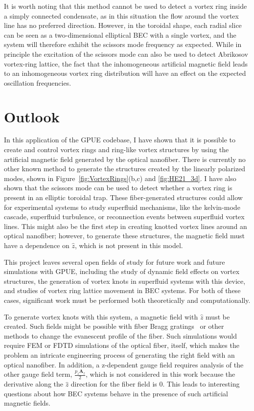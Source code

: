 It is worth noting that this method cannot be used to detect a vortex ring inside a simply connected condensate, as in this situation the flow around the vortex line has no preferred direction.
However, in the toroidal shape, each radial slice can be seen as a two-dimensional elliptical BEC with a single vortex, and the system will therefore exhibit the scissors mode frequency as expected.
While in principle the excitation of the scissors mode can also be used to detect Abrikosov vortex-ring lattice, the fact that the inhomogeneous artificial magnetic field leads to an inhomogeneous vortex ring distribution will have an effect on the expected oscillation frequencies.

\section{Outlook}

In this application of the GPUE codebase, I have shown that it is possible to create and control vortex rings and ring-like vortex structures by using the artificial magnetic field generated by the optical nanofiber.
There is currently no other known method to generate the structures created by the linearly polarized modes, shown in Figure~\ref{fig:VortexRings}(b,c) and \ref{fig:HE21_3d}.
I have also shown that the scissors mode can be used to detect whether a vortex ring is present in an elliptic toroidal trap.
These fiber-generated structures could allow for experimental systems to study superfluid mechanisms, like the kelvin-mode cascade, superfluid turbulence, or reconnection events between superfluid vortex lines.
This might also be the first step in creating knotted vortex lines around an optical nanofiber; however, to generate these structures, the magnetic field must have a dependence on $\hat z$, which is not present in this model.

This project leaves several open fields of study for future work and future simulations with GPUE, including the study of dynamic field effects on vortex structures, the generation of vortex knots in superfluid systems with this device, and studies of vortex ring lattice movement in BEC systems.
For both of these cases, significant work must be performed both theoretically and computationally.

To generate vortex knots with this system, a magnetic field with $\hat z$ must be created.
Such fields might be possible with fiber Bragg gratings~\cite{hill1997} or other methods to change the evanescent profile of the fiber.
Such simulations would require FEM or FDTD simulations of the optical fiber, itself, which makes the problem an intricate engineering process of generating the right field with an optical nanofiber.
In addition, a z-dependent gauge field requires analysis of the other gauge field term, $\frac{p_z\mathbf{A}_z}{2}$, which is not considered in this work because the derivative along the $\hat z$ direction for the fiber field is 0.
This leads to interesting questions about how BEC systems behave in the presence of such artificial magnetic fields.

